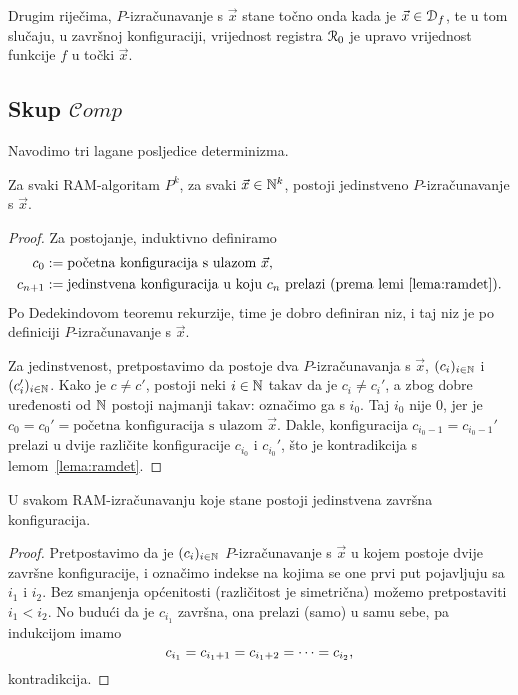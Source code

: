 Drugim riječima, $P$-izračunavanje s $\vec x$ stane točno onda kada je $\vec x\in\mathcal D_{f}$, te u tom slučaju, u završnoj konfiguraciji, vrijednost registra $\mathcal R_{0}$ je upravo vrijednost funkcije $f$ u točki $\vec x$.

\subsection{Skup \texorpdfstring{$\mathcal Comp$}{Comp}}

Navodimo tri lagane posljedice determinizma.

\begin{propozicija}[{name=[jedinstvenost izračunavanja]}]\label{prop:ramdet}
Za svaki RAM-algoritam $P^k$, za svaki $\vec x\in{\mathbb N}^k$, postoji jedinstveno $P$-izračunavanje s $\vec x$.
\end{propozicija}
\begin{proof}
Za postojanje, induktivno definiramo
\begin{align}
    c_0&:=\text{početna konfiguracija s ulazom $\vec x$,}\\
    c_{n+1}&:=\text{jedinstvena konfiguracija u koju $c_n$ prelazi (prema lemi~\ref{lema:ramdet}).}
\end{align}
Po Dedekindovom teoremu rekurzije, time je dobro definiran niz, i taj niz je po definiciji $P$-iz\-ra\-ču\-na\-va\-nje s $\vec x$.

Za jedinstvenost, pretpostavimo da postoje dva $P$-izračunavanja s $\vec x$, $(c_i)_{i\in{\mathbb N}}$ i $(c_i')_{i\in{\mathbb N}}$.
Kako je $c\not=c'$, postoji neki $i\in{\mathbb N}$ takav da je $c_i\not=c_i'$, a zbog dobre uređenosti od ${\mathbb N}$ postoji najmanji takav: označimo ga s $i_0$.
Taj $i_0$ nije $0$, jer je $c_0=c_0'=\text{početna konfiguracija s ulazom $\vec x$}$. Dakle, konfiguracija $c_{i_0-1}=c_{i_0-1}'$ prelazi u dvije različite konfiguracije $c_{i_0}$ i $c_{i_0}'$, što je kontradikcija s lemom~\ref{lema:ramdet}.
\end{proof}

\begin{propozicija}[{name=[jedinstvenost završne konfiguracije]}]\label{prop:ram1zav}
U svakom RAM-izračunavanju koje stane postoji jedinstvena za\-vrš\-na konfiguracija.
\end{propozicija}
\begin{proof}
Pretpostavimo da je $(c_i)_{i\in{\mathbb N}}$ $P$-izračunavanje s $\vec x$ u kojem postoje dvije završne konfiguracije, i označimo indekse na kojima se one prvi put pojavljuju sa $i_1$ i $i_2$. Bez smanjenja općenitosti (različitost je simetrična) možemo pretpostaviti $i_1<i_2$. No budući da je $c_{i_1}$ završna, ona prelazi (samo) u samu sebe, pa indukcijom imamo
\begin{equation}
    c_{i_1}=c_{i_1+1}=c_{i_1+2}=\dotsb=c_{i_2}\text,
\end{equation}
kontradikcija.
\end{proof}

